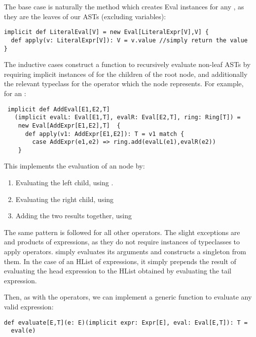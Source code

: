The base case is naturally the method which creates Eval instances for any , as they are the leaves of our ASTs (excluding variables):
\vs\begin{lstlisting}
implicit def LiteralEval[V] = new Eval[LiteralExpr[V],V] {
  def apply(v: LiteralExpr[V]): V = v.value //simply return the value
}
\end{lstlisting}\vs
The inductive cases construct a function to recursively evaluate non-leaf ASTs by requiring implicit instances of  for the children of the root node, and additionally the relevant typeclass for the operator which the node represents. For example, for an :
\vs\begin{lstlisting}
 implicit def AddEval[E1,E2,T]
   (implicit evalL: Eval[E1,T], evalR: Eval[E2,T], ring: Ring[T]) =
    new Eval[AddExpr[E1,E2],T]  {
      def apply(v1: AddExpr[E1,E2]): T = v1 match {
        case AddExpr(e1,e2) => ring.add(evalL(e1),evalR(e2))
    }
\end{lstlisting}\vs
This implements the evaluation of an  node by:
\begin{enumerate}
\item{Evaluating the left child, using }.
\item{Evaluating the right child, using }
\item{Adding the two results together, using }
\end{enumerate}
The same pattern is followed for all other operators. The slight exceptions are  and products of expressions, as they do not require instances of typeclasses to apply operators.  simply evaluates its arguments and constructs a singleton  from them. In the case of an HList of expressions, it simply prepends the result of evaluating the head expression to the HList obtained by evaluating the tail expression.

Then, as with the operators, we can implement a generic function to evaluate any valid expression:
\vs\begin{lstlisting}
def evaluate[E,T](e: E)(implicit expr: Expr[E], eval: Eval[E,T]): T =
  eval(e)
\end{lstlisting}\vs

